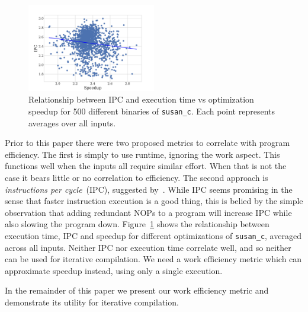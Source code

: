     \begin{figure}[t]
        \centering
        \includegraphics[width=0.5\textwidth]{figs/motivation-metric.pdf}
        \caption{
            Relationship between IPC and execution time vs optimization speedup for 500 different binaries of \texttt{susan\_c}.
            Each point represents averages over all inputs.
        }
        \label{fig:motivation-metric}
    \end{figure}
    
    Prior to this paper there were two proposed metrics to correlate with program efficiency. The first is simply to use runtime, ignoring
    the work aspect. This functions well when the inputs all require similar effort. When that is not the case it bears little or no
    correlation to efficiency. The second approach is \textit{instructions per cycle}~(IPC), suggested by~\citep{fursin07}. While IPC seems
    promising in the sense that faster instruction execution is a good thing, this is belied by the simple observation that adding
    redundant NOPs to a program will increase IPC while also slowing the program down. Figure~\ref{fig:motivation-metric} shows the
    relationship between execution time, IPC and speedup for different optimizations of \texttt{susan\_c}, averaged across all inputs.
    Neither IPC nor execution time correlate well, and so neither can be used for iterative compilation. We need a work efficiency metric
    which can approximate speedup instead, using only a single execution. 

    In the remainder of this paper we present our work efficiency metric and demonstrate its utility for iterative compilation.
    
